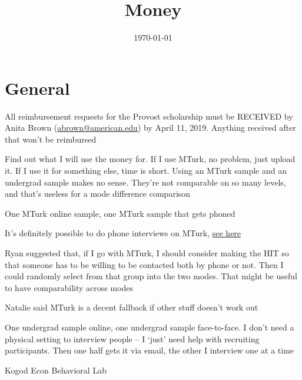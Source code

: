 

\title{Money}

\date{\today}



\maketitle



\section*{General}
	\begin{coi}
		\item All reimbursement requests for the Provost scholarship must be RECEIVED by Anita Brown (\href{mailto:abrown@american.edu}{abrown@american.edu}) by April 11, 2019. Anything received after that won't be reimbursed
		\item Find out what I will use the money for. If I use MTurk, no problem, just upload it. If I use it for something else, time is short. Using an MTurk sample and an undergrad sample makes no sense. They're not comparable on so many levels, and that's useless for a mode difference comparison
		\item One MTurk online sample, one MTurk sample that gets phoned
			\begin{coi}
				\item It's definitely possible to do phone interviews on MTurk, \href{https://customerdevlabs.com/2012/08/21/using-mturk-to-interview-100-customers-in-4-hours/}{see here}
				\item Ryan suggested that, if I go with MTurk, I should consider making the HIT so that someone has to be willing to be contacted both by phone or not.  Then I could randomly select from that group into the two modes.  That might be useful to have comparability across modes
				\item Natalie said MTurk is a decent fallback if other stuff doesn't work out
			\end{coi}
		\item One undergrad sample online, one undergrad sample face-to-face. I don't need a physical setting to interview people -- I `just' need help with recruiting participants. Then one half gets it via email, the other I interview one at a time
			\begin{coi}
				\item Kogod Econ Behavioral Lab

\end{coi}
\end{coi}
